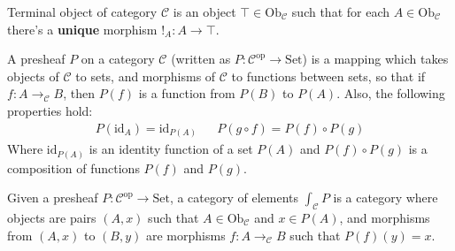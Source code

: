 \begin{definition}
    Terminal object of category $\mathcal{C}$ is an
    object $\top\in\mathrm{Ob}_\mathcal{C}$ such that
    for each $A\in\mathrm{Ob}_\mathcal{C}$ there's a
    \textbf{unique} morphism $!_A:A\to\top$.
\end{definition}

\begin{definition}[Presheaf]
    A presheaf $P$ on a category $\mathcal{C}$ (written
    as $P:\mathcal{C}^\mathrm{op}\to\mathrm{Set}$) is a
    mapping which takes objects of $\mathcal{C}$ to
    sets, and morphisms of $\mathcal{C}$ to functions
    between sets, so that if $f:A\to_\mathcal{C} B$,
    then $P(f)$ is a function from $P(B)$ to $P(A)$.
    Also, the following properties hold:
    \begin{align*}
        P(\mathrm{id}_A)=\mathrm{id}_{P(A)} & &
        P(g\circ f)=P(f)\circ P(g)
    \end{align*}
    Where $\mathrm{id}_{P(A)}$ is an identity function
    of a set $P(A)$ and $P(f)\circ P(g)$ is a
    composition of functions $P(f)$ and $P(g)$.
\end{definition}

\begin{definition}
    Given a presheaf $P:\mathcal{C}^\mathrm{op}\to
    \mathrm{Set}$, a category of elements
    $\int_\mathcal{C}P$ is a category where objects are
    pairs $(A, x)$ such that
    $A\in\mathrm{Ob}_\mathcal{C}$ and $x\in P(A)$, and
    morphisms from $(A, x)$ to $(B, y)$ are morphisms
    $f:A\to_\mathcal{C} B$ such that $P(f)(y)=x$.
\end{definition}

